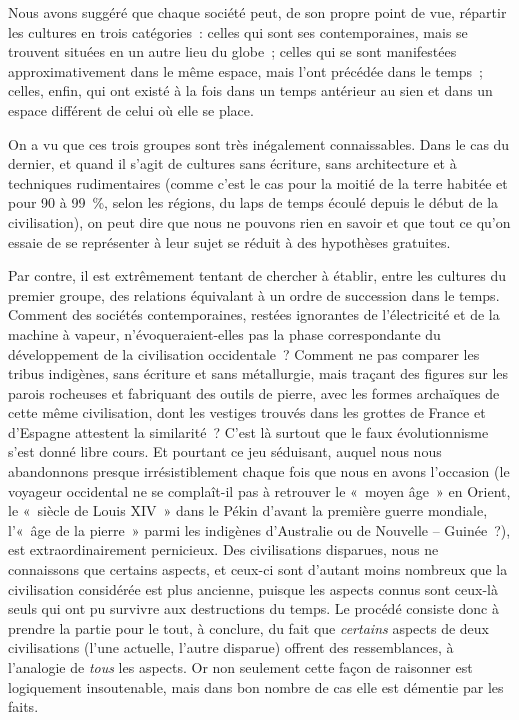 \documentclass[french,twoside]{book} %
\begin{document}
\noindent Nous avons suggéré que chaque société peut, de son propre point de vue, répartir les cultures en trois catégories : celles qui sont ses contemporaines, mais se trouvent situées en un autre lieu du globe ; celles qui se sont manifestées approximativement dans le même espace, mais l’ont précédée dans le temps ; celles, enfin, qui ont existé à la fois dans un temps antérieur au sien et dans un espace différent de celui où elle se place.\par
On a vu que ces trois groupes sont très inégalement connaissables. Dans le cas du dernier, et quand il s’agit de cultures sans écriture, sans architecture et à techniques rudimentaires (comme c’est le cas pour la moitié de la terre habitée et pour 90 à 99 \%, selon les régions, du laps de temps écoulé depuis le début de la civilisation), on peut dire que nous ne pouvons rien en savoir et que tout ce qu’on essaie de se représenter à leur sujet se réduit à des hypothèses gratuites.\par
Par contre, il est extrêmement tentant de chercher à établir, entre les cultures du premier groupe, des relations équivalant à un ordre de succession dans le temps. Comment des sociétés contemporaines, restées ignorantes de l’électricité et de la machine à vapeur, n’évoqueraient-elles pas la phase correspondante du développement de la civilisation occidentale ? Comment ne pas comparer les tribus indigènes, sans écriture et sans métallurgie, mais traçant des figures sur les parois rocheuses et fabriquant des outils de pierre, avec les formes archaïques de cette même civilisation, dont les vestiges trouvés dans les grottes de France et d’Espagne attestent la similarité ? C’est là surtout que le faux évolutionnisme s’est donné libre cours. Et pourtant ce jeu séduisant, auquel nous nous abandonnons presque irrésistiblement chaque fois que nous en avons l’occasion (le voyageur occidental ne se complaît-il pas à retrouver le « moyen âge » en Orient, le « siècle de Louis XIV » dans le Pékin d’avant la première guerre mondiale, l’« âge de la pierre » parmi les indigènes d’Australie ou de Nouvelle – Guinée ?), est extraordinairement pernicieux. Des civilisations disparues, nous ne connaissons que certains aspects, et ceux-ci sont d’autant moins nombreux que la civilisation considérée est plus ancienne, puisque les aspects connus sont ceux-là seuls qui ont pu survivre aux destructions du temps. Le procédé consiste donc à prendre la partie pour le tout, à conclure, du fait que \emph{certains} aspects de deux civilisations (l’une actuelle, l’autre disparue) offrent des ressemblances, à l’analogie de \emph{tous} les aspects. Or non seulement cette façon de raisonner est logiquement insoutenable, mais dans bon nombre de cas elle est démentie par les faits.\par
\end{document}
